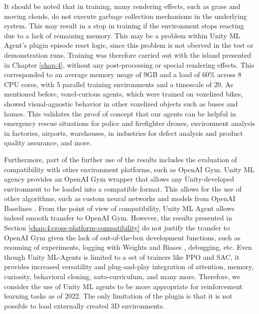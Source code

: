     It should be noted that in training, many rendering effects, such as grass and moving clouds, do not execute garbage collection mechanisms in the underlying system. This may result in a stop in training if the environment stops reacting due to a lack of remaining memory.
    This may be a problem within Unity ML Agent's plugin episode reset logic, since this problem is not oberved in the test or demonstration runs.
    Training was therefore carried out with the island presented in Chapter \ref{chap:4}, without any post-processing or special rendering effects.
    This corresponded to an average memory usage of 9GB and a load of 60\% across 8 CPU cores, with 5 parallel training environments and a timescale of 20.
    As mentioned before, voxel-curious agents, which were trained on voxelized bikes, showed visual-agnostic behavior in other voxelized objects such as buses and homes.
    This validates the proof of concept that our agents can be helpful in emergency rescue situations for police and firefighter drones, environment analysis in factories, airports, warehouses, in industries for defect analysis and product quality assurance, and more.
    
    Furthermore, part of the further use of the results includes the evaluation of compatibility with other environment platforms, such as OpenAI Gym. 
    Unity ML agency provides an OpenAI Gym wrapper that allows any Unity-developed environment to be loaded into a compatible format. 
    This allows for the use of other algorithms, such as custom neural networks and models from OpenAI Baselines \cite{github-dlr-rm-baselines3}.
    From the point of view of compatibility, Unity ML Agent allows indeed smooth transfer to OpenAI Gym.
    However, the results presented in Section \ref{chap:4:cross-platform-compatibility} do not justify the transfer to OpenAI Gym given the lack of out-of-the-box development functions, such as resuming of experiments, logging with Weights and Biases \cite{wandb2022}, debugging, etc. Even though Unity ML-Agents is limited to a set of trainers like PPO and SAC, it provides increased versatility and plug-and-play integration of attention, memory, curiosity, behavioral cloning, auto-curriculum, and many more. Therefore, we consider the use of Unity ML agents to be more appropriate for reinforcement learning tasks as of 2022. The only limitation of the plugin is that it is not possible to load externally created 3D environments.


